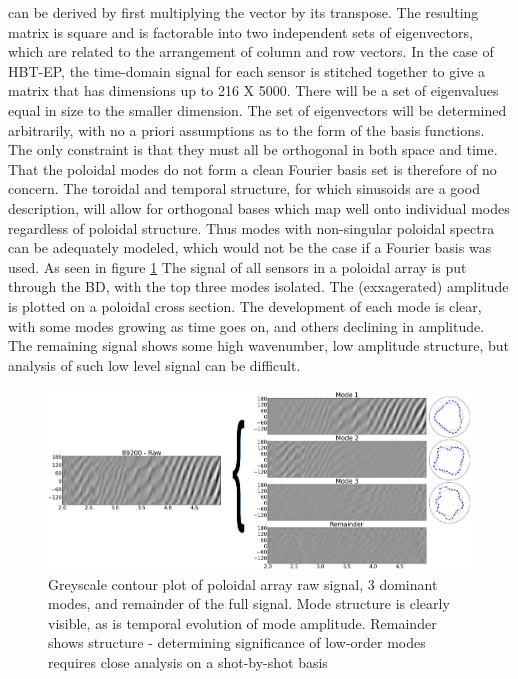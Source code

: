   can be derived by first multiplying the vector by its transpose.  The resulting matrix is square and is factorable into two independent sets of eigenvectors, which are related to the arrangement of column and row vectors.  
In the case of HBT-EP, the time-domain signal for each sensor is stitched together to give a matrix that has dimensions up to 216 X 5000.  There will be a set of eigenvalues equal in size to the smaller dimension.  The set of eigenvectors will be determined arbitrarily, with no a priori assumptions as to the form of the basis functions.  The only constraint is that they must all be orthogonal in both space and time.  That the poloidal modes do not form a clean Fourier basis set is therefore of no concern.  The toroidal and temporal structure, for which sinusoids are a good description, will allow for orthogonal bases which map well onto individual modes regardless of poloidal structure.  Thus modes with non-singular poloidal spectra can be adequately modeled, which would not be the case if a Fourier basis was used.
As seen in figure \ref{PA_sensors_top_3_modes} The signal of all sensors in a poloidal array is put through the BD, with the top three modes isolated.  The (exxagerated) amplitude is plotted on a poloidal cross section.  The development of each mode is clear, with some modes growing as time goes on, and others declining in amplitude.  The remaining signal shows some high wavenumber, low amplitude structure, but analysis of such low level signal can be difficult.


\begin{figure}
\includegraphics[width = \textwidth]{./figures/stripey_flucts_joined_grey_89200_mod.png}\begin{flushleft}
\caption{Greyscale contour plot of poloidal array raw signal, 3 dominant modes, and remainder of the full signal.  Mode structure is clearly visible, as is temporal evolution of mode amplitude.  Remainder shows structure - determining significance of low-order modes requires close analysis on a shot-by-shot basis}
\end{flushleft}
\label{PA_sensors_top_3_modes}
\end{figure}


